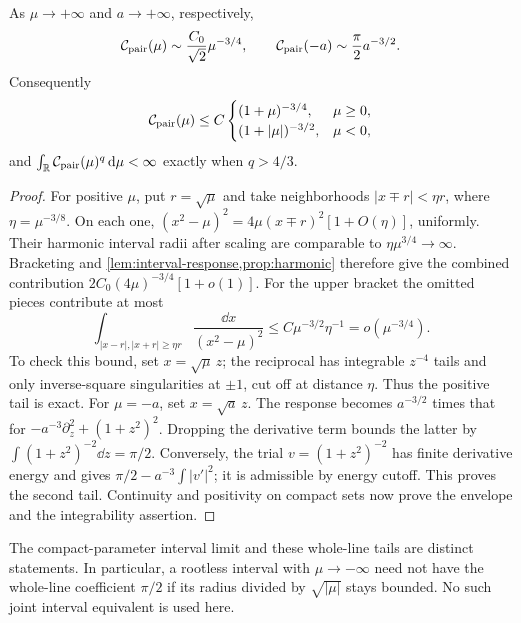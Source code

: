 \begin{proposition}\label{prop:pair-tails}
As $\mu\to+\infty$ and $a\to+\infty$, respectively,
\begin{equation}\label{eq:pair-tails}
 \mathcal C_{\rm pair}(\mu)\sim\frac{C_0}{\sqrt2}\mu^{-3/4},
 \qquad
 \mathcal C_{\rm pair}(-a)\sim\frac\pi2 a^{-3/2}.
\end{equation}
Consequently
\begin{equation}\label{eq:pair-envelope}
 \mathcal C_{\rm pair}(\mu)\le C
 \begin{cases}(1+\mu)^{-3/4},&\mu\ge0,\\
 (1+|\mu|)^{-3/2},&\mu<0,
 \end{cases}
\end{equation}
and $\int_\mathbb R\mathcal C_{\rm pair}(\mu)^q\,\mathrm d\mu<\infty$
exactly when $q>4/3$.
\end{proposition}
\begin{proof}
For positive $\mu$, put $r=\sqrt\mu$ and take neighborhoods
$|x\mp r|<\eta r$, where $\eta=\mu^{-3/8}$. On each one,
$(x^2-\mu)^2=4\mu(x\mp r)^2[1+O(\eta)]$, uniformly.
Their harmonic interval radii after scaling are comparable to
$\eta\mu^{3/4}\to\infty$. Bracketing and
\cref{lem:interval-response,prop:harmonic} therefore give the combined
contribution $2C_0(4\mu)^{-3/4}[1+o(1)]$.
For the upper bracket the omitted pieces contribute at most
\[
 \int_{|x-r|,|x+r|\ge\eta r}\frac{\dd x}{(x^2-\mu)^2}
 \le C\mu^{-3/2}\eta^{-1}=o(\mu^{-3/4}).
\]
To check this bound, set $x=\sqrt\mu\,z$; the reciprocal has integrable
$z^{-4}$ tails and only inverse-square singularities at $\pm1$,
cut off at distance $\eta$. Thus the positive tail is exact.
For $\mu=-a$, set $x=\sqrt a\,z$. The response becomes $a^{-3/2}$
times that for $-a^{-3}\partial_z^2+(1+z^2)^2$.
Dropping the derivative term bounds the latter by
$\int(1+z^2)^{-2}\dd z=\pi/2$. Conversely, the trial
$v=(1+z^2)^{-2}$ has finite derivative energy and gives
$\pi/2-a^{-3}\int|v'|^2$; it is admissible by energy cutoff.
This proves the second tail. Continuity and positivity on compact
sets now prove the envelope and the integrability assertion.
\end{proof}

The compact-parameter interval limit and these whole-line tails are
distinct statements. In particular, a rootless interval with
$\mu\to-\infty$ need not have the whole-line coefficient $\pi/2$ if
its radius divided by $\sqrt{|\mu|}$ stays bounded. No such joint
interval equivalent is used here.

